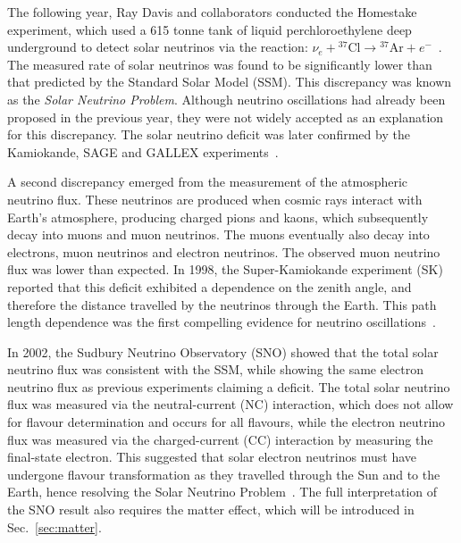 The following year, Ray Davis and collaborators conducted the Homestake experiment, which used a 615 tonne tank of liquid perchloroethylene deep underground to detect solar neutrinos via the reaction: $\nu_{e} + {}^{37}\mathrm{Cl} \rightarrow {}^{37}\mathrm{Ar} + e^{-}$~\cite{Davis1968,Miramonti2009}.
The measured rate of solar neutrinos was found to be significantly lower than that predicted by the Standard Solar Model (SSM).
This discrepancy was known as the \emph{Solar Neutrino Problem}.
Although neutrino oscillations had already been proposed in the previous year, they were not widely accepted as an explanation for this discrepancy.
The solar neutrino deficit was later confirmed by the Kamiokande, SAGE and GALLEX experiments~\cite{Hirata1990,Abazov1991,Anselmann1992}.

A second discrepancy emerged from the measurement of the atmospheric neutrino flux.
These neutrinos are produced when cosmic rays interact with Earth's
atmosphere, producing charged pions and kaons, which subsequently decay
into muons and muon neutrinos. The muons eventually also decay into
electrons, muon neutrinos and electron neutrinos.
The observed muon neutrino flux was lower than expected.
In 1998, the Super-Kamiokande experiment (SK) reported that this deficit exhibited a dependence on the zenith angle, and therefore the distance travelled by the neutrinos through the Earth.
This path length dependence was the first compelling evidence for neutrino oscillations~\cite{Fukuda1998}.

In 2002, the Sudbury Neutrino Observatory (SNO) showed that the total solar neutrino flux was consistent with the SSM, while showing the same electron neutrino flux as previous experiments claiming a deficit.
The total solar neutrino flux was measured via the neutral-current (NC)
interaction, which does not allow for flavour determination and occurs
for all flavours, while the electron neutrino flux was measured via the
charged-current (CC) interaction by measuring the final-state electron.
This suggested that solar electron neutrinos must have undergone flavour transformation as they travelled through the Sun and to the Earth, hence resolving the Solar Neutrino Problem~\cite{Ahmad2002}.
The full interpretation of the SNO result also requires the matter effect, which will be introduced in Sec.~\ref{sec:matter}.


